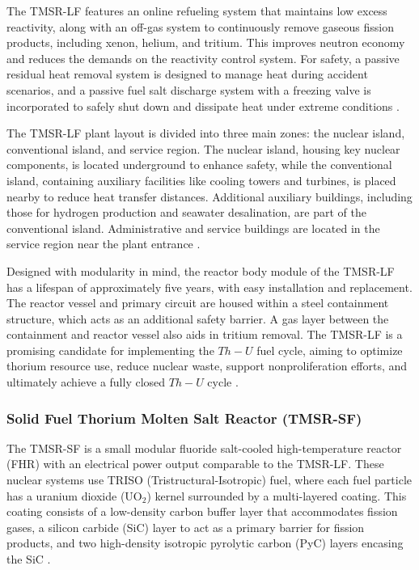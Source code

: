 The TMSR-LF features an online refueling system that maintains low excess reactivity, along with an off-gas system to continuously remove gaseous fission products, including xenon, helium, and tritium. This improves neutron economy and reduces the demands on the reactivity control system. For safety, a passive residual heat removal system is designed to manage heat during accident scenarios, and a passive fuel salt discharge system with a freezing valve is incorporated to safely shut down and dissipate heat under extreme conditions \cite{TMSR_book}.

The TMSR-LF plant layout is divided into three main zones: the nuclear island, conventional island, and service region. The nuclear island, housing key nuclear components, is located underground to enhance safety, while the conventional island, containing auxiliary facilities like cooling towers and turbines, is placed nearby to reduce heat transfer distances. Additional auxiliary buildings, including those for hydrogen production and seawater desalination, are part of the conventional island. Administrative and service buildings are located in the service region near the plant entrance \cite{TMSR_book}.

Designed with modularity in mind, the reactor body module of the TMSR-LF has a lifespan of approximately five years, with easy installation and replacement. The reactor vessel and primary circuit are housed within a steel containment structure, which acts as an additional safety barrier. A gas layer between the containment and reactor vessel also aids in tritium removal. The TMSR-LF is a promising candidate for implementing the \(Th-U\) fuel cycle, aiming to optimize thorium resource use, reduce nuclear waste, support nonproliferation efforts, and ultimately achieve a fully closed \(Th-U\) cycle \cite{TMSR_book}.

\subsubsection{Solid Fuel Thorium Molten Salt Reactor (TMSR-SF)}

The TMSR-SF is a small modular fluoride salt-cooled high-temperature reactor (FHR) with an electrical power output comparable to the TMSR-LF. These nuclear systems use TRISO (Tristructural-Isotropic) fuel, where each fuel particle has a uranium dioxide (\(\text{UO}_2\)) kernel surrounded by a multi-layered coating. This coating consists of a low-density carbon buffer layer that accommodates fission gases, a silicon carbide (SiC) layer to act as a primary barrier for fission products, and two high-density isotropic pyrolytic carbon (PyC) layers encasing the SiC \cite{TRISO, IAEA_TRISO_REPORT}.

